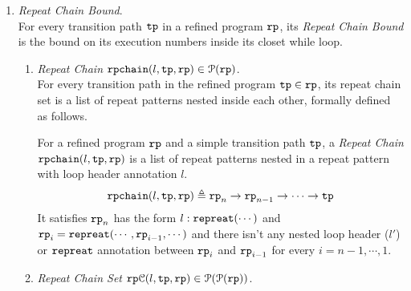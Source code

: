 \begin{enumerate}
  \item \emph{Repeat Chain Bound}.
  \\
  For every transition path $\mathtt{tp}$ in a refined program $\mathtt{rp}$,
  its \emph{Repeat Chain Bound} is the
  bound on its execution numbers inside its closet while loop.
  \begin{enumerate}
\item \emph{Repeat Chain} $\mathtt{rpchain}(l, \mathtt{tp}, \mathtt{rp}) \in \mathcal{P}(\mathtt{rp})$.
\\
For every transition path in the refined program $\mathtt{tp} \in \mathtt{rp}$, 
its repeat chain set %
is a list of repeat patterns nested inside each other, formally defined as follows.
 \begin{defn}
  \label{def:repeatchain}
For a refined program $\mathtt{rp}$ and a simple transition path $\mathtt{tp}$,
a \emph{Repeat Chain} $\mathtt{rpchain}(l, \mathtt{tp}, \mathtt{rp})$
is a list of repeat patterns nested in a repeat pattern with loop header annotation $l$.
\[
  \mathtt{rpchain}(l, \mathtt{tp}, \mathtt{rp}) \triangleq \mathtt{rp}_n \to \mathtt{rp}_{n-1} \to \cdots \to \mathtt{tp}
\]
It satisfies
$\mathtt{rp}_{n} $ has the form $l : \mathtt{repreat}(\cdots)$ and
 $\mathtt{rp}_{i}= \mathtt{repreat}(\cdots, \mathtt{rp}_{i - 1}, \cdots)$ and
 there isn't any nested loop header ($l'$) or $\mathtt{repreat}$ annotation between $\mathtt{rp}_{i}$ and $\mathtt{rp}_{i - 1}$
 for every $i = n-1, \cdots, 1$.
\end{defn}
%
%
\item \emph{Repeat Chain Set}
$\mathtt{rp}\mathcal{C}(l, \mathtt{tp}, \mathtt{rp}) \in \mathcal{P}(\mathcal{P}(\mathtt{rp}))$.

\end{enumerate}
\end{enumerate}
